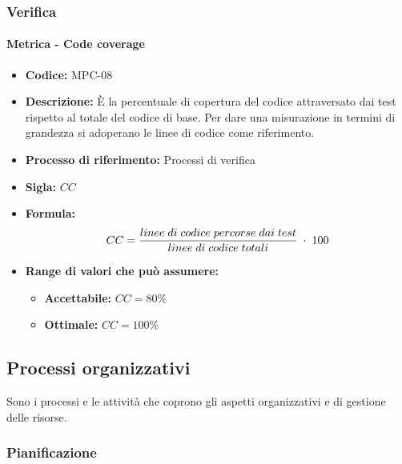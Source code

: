\subsubsection{Verifica}
    \paragraph{Metrica - Code coverage}
    \begin{itemize}
        \item \textbf{Codice:} MPC-08
        \item \textbf{Descrizione:} È la percentuale di copertura del codice attraversato dai test rispetto al totale del codice di base. Per dare una misurazione in termini di grandezza si adoperano le linee di codice come riferimento.
        \item \textbf{Processo di riferimento:} Processi di verifica
        \item \textbf{Sigla:} $CC$
        \item \textbf{Formula:} $$CC = {linee \; di \; codice \; percorse \; dai  \; test \over linee \; di \; codice \; totali} \; \cdot \; 100$$
        \item \textbf{Range di valori che può assumere:}
        \begin{itemize}
            \item \textbf{Accettabile:} $CC = 80\%$
            \item \textbf{Ottimale:} $CC = 100\%$
        \end{itemize}
    \end{itemize}

\subsection{Processi organizzativi}
Sono i processi e le attività che coprono gli aspetti organizzativi e di gestione delle risorse.

\subsubsection{Pianificazione}
